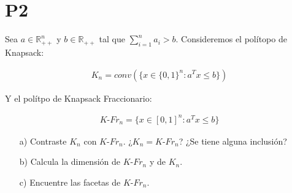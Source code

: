 \documentclass[10pt]{article}
\theoremstyle{plain}
\theoremstyle{definition}
\begin{document}
\section{P2}
Sea $a\in \mathbb{R}^{n}_{++}$ y $b\in\mathbb{R}_{++}$ tal que $\sum_{i=1}^{n}a_{i}>b$. Consideremos el polítopo de Knapsack:

\begin{align*}
K_{n} = conv(\{x\in\{0,1\}^{n}:a^{T}x\leq b\})
\end{align*}

Y el polítpo de Knapsack Fraccionario:

\begin{align*}
K\text{-}Fr_{n} = \{x\in[0,1]^{n}:a^{T}x\leq b\}
\end{align*}

\begin{itemize}
\item[a)] Contraste $K_{n}$ con $K\text{-}Fr_{n}$. ¿$K_{n}=K\text{-}Fr_{n}$? ¿Se tiene alguna inclusión?
\item[b)] Calcula la dimensión de $K\text{-}Fr_{n}$ y de $K_{n}$.
\item[c)] Encuentre las facetas de $K\text{-}Fr_{n}$.
\end{itemize}
\end{document}
